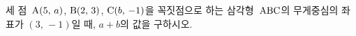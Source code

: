 세 점~$\mathrm{A}(5,\,a)$, $\mathrm{B}(2,\,3)$, $\mathrm{C}(b,\,-1)$을 꼭짓점으로 하는 삼각형~$\mathrm{ABC}$의 무게중심의 좌표가 $(3,\,-1)$일 때, $a+b$의 값을 구하시오.
